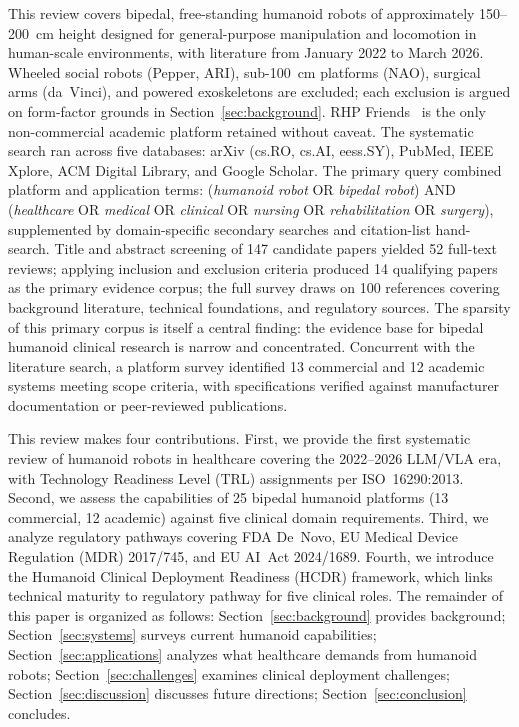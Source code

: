 \documentclass[acmjour]{acmart}
\begin{document}
This review covers bipedal, free-standing humanoid robots of approximately
150--200~cm height designed for general-purpose manipulation and locomotion in
human-scale environments, with literature from January 2022 to March 2026.
Wheeled social robots (Pepper, ARI), sub-100~cm platforms (NAO), surgical arms
(da~Vinci), and powered exoskeletons are excluded; each exclusion is argued on
form-factor grounds in Section~\ref{sec:background}. RHP
Friends~\cite{benallegue2025rhp} is the only non-commercial academic platform
retained without caveat. The systematic search ran across five databases: arXiv
(cs.RO, cs.AI, eess.SY), PubMed, IEEE Xplore, ACM Digital Library, and Google
Scholar. The primary query combined platform and application terms:
(\emph{humanoid robot} OR \emph{bipedal robot}) AND (\emph{healthcare} OR
\emph{medical} OR \emph{clinical} OR \emph{nursing} OR \emph{rehabilitation} OR
\emph{surgery}), supplemented by domain-specific secondary searches and
citation-list hand-search. Title and abstract screening of 147 candidate papers
yielded 52 full-text reviews; applying inclusion and exclusion criteria produced
14 qualifying papers as the primary evidence corpus; the full survey draws on
100 references covering background literature, technical foundations, and
regulatory sources. The sparsity of this primary corpus is itself a central
finding: the evidence base for bipedal humanoid clinical research is narrow
and concentrated.
Concurrent with the literature search, a platform survey identified 13
commercial and 12 academic systems meeting scope criteria, with specifications
verified against manufacturer documentation or peer-reviewed publications.

This review makes four contributions. First, we provide the first systematic
review of humanoid robots in healthcare covering the 2022--2026 LLM/VLA era,
with Technology Readiness Level (TRL) assignments per ISO~16290:2013. Second, we
assess the capabilities of 25 bipedal humanoid platforms (13 commercial, 12
academic) against five clinical domain requirements. Third, we analyze
regulatory pathways covering FDA De~Novo, EU Medical Device Regulation (MDR)
2017/745, and EU AI~Act 2024/1689. Fourth, we introduce the Humanoid Clinical
Deployment Readiness (HCDR) framework, which links technical maturity to
regulatory pathway for five clinical roles.
The remainder of this paper is organized as follows:
Section~\ref{sec:background} provides background; Section~\ref{sec:systems}
surveys current humanoid capabilities; Section~\ref{sec:applications} analyzes
what healthcare demands from humanoid robots; Section~\ref{sec:challenges}
examines clinical deployment challenges; Section~\ref{sec:discussion} discusses
future directions; Section~\ref{sec:conclusion} concludes.
\end{document}
